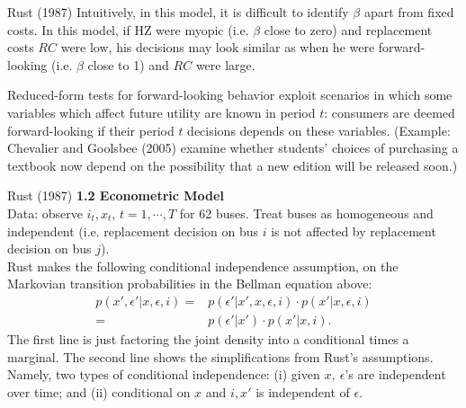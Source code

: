 \documentclass[xcolor=pdftex,dvipsnames,table,mathserif]{beamer}
\begin{document}
\begin{frame}{Rust (1987)}
Intuitively, in this model, it is difficult to identify $\beta$ apart from fixed costs. In this model, if HZ were myopic (i.e. $\beta$ close to zero) and replacement costs $RC$ were low, his decisions may look similar as when he were forward-looking (i.e. $\beta$ close to 1) and $RC$ were large. \\
\vspace{.5cm}

Reduced-form tests for forward-looking behavior exploit scenarios in which some variables which affect future utility are known in period $t$: consumers are deemed forward-looking if their period $t$ decisions depends on these variables. (Example: Chevalier and Goolsbee (2005) examine whether students' choices of purchasing a textbook now depend on the possibility that a new edition will be released soon.) 
\end{frame}

\begin{frame}{Rust (1987)}
\vspace{.5mm}
{\bf 1.2 Econometric Model} \\
\vspace{3mm}
Data: observe $i_t, x_t$, $t=1, \cdots, T$ for 62 buses. Treat buses as homogeneous and independent (i.e. replacement decision on bus $i$ is not affected by replacement decision on bus $j$). \\
\vspace{3mm}
Rust makes the following conditional independence assumption, on the Markovian transition probabilities in the Bellman equation above:
\begin{equation}
\begin{split}
p(x', \epsilon ' | x, \epsilon, i) = & p(\epsilon '| x', x, \epsilon, i) \cdot p(x' | x, \epsilon, i) \\
 = & p(\epsilon ' | x') \cdot p (x' |x ,i ). 
\end{split}
\end{equation}
The first line is just factoring the joint density into a conditional times a marginal. The second line shows the simplifications from Rust's assumptions. Namely, two types of conditional independence: (i) given $x, ~ \epsilon$'s are independent over time; and (ii) conditional on $x$ and $i, x'$ is independent of $\epsilon$. 
\end{frame}
\end{document}
